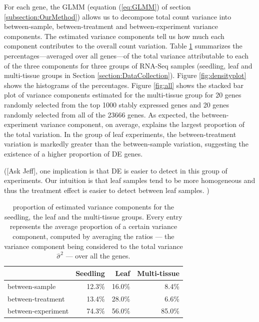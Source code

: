 \documentclass[11pt, a4paper]{article}
\begin{document}
For each gene, the GLMM (equation (\ref{eq:GLMM}) of section
\ref{subsection:OurMethod}) allows us to decompose total count variance into
between-sample, between-treatment and between-experiment variance components.
The estimated variance components tell us how much each component contributes
to the overall count variation. Table \ref{table:percentageofvariation}
summarizes the percentages---averaged over all genes---of the total variance
attributable to each of the three components for three groups of RNA-Seq
samples (seedling, leaf and multi-tissue groups in Section \ref{section:DataCollection}). Figure \ref{fig:densityplot}
shows the histograms of the percentages. 
Figure \ref{fig:all} shows the stacked bar plot of variance components 
estimated for the multi-tissue group for 20
genes randomly selected from the top 1000 stably expressed genes 
and 20 genes randomly selected from all of the 23666 genes. 
As expected, the between-experiment variance component, on average, explains
the largest proportion of the total variation. In the group of leaf
experiments, the between-treatment variation is markedly greater than the
between-sample variation, suggesting the existence of a higher proportion of DE genes.

([Ask Jeff], one implication is that DE is easier to detect in
this group of experiments.  
 Our intuition is that leaf samples tend
to be more homogeneous and thus the treatment effect is easier to detect
between leaf samples. ) 
 
 \begin{center} \begin{table}[h!] \centering \caption{proportion of estimated
     variance components for the seedling, the leaf and the multi-tissue groups. Every entry represents the average proportion of a certain variance component, computed by averaging the ratios --- the variance component being considered to the total variance $\hat{\sigma}^2$ --- over all the genes.} \label{table:percentageofvariation}
     \begin{tabular}{lrrr}\hline & Seedling & Leaf & Multi-tissue \\  \hline
	 between-sample     & 12.3\%   & 16.0\% & 8.4\%           \\
	 between-treatment  & 13.4\%   & 28.0\% & 6.6\%           \\
	 between-experiment & 74.3\%   & 56.0\% & 85.0\%         \\ \hline
     \end{tabular} \end{table} \end{center}
\end{document}
